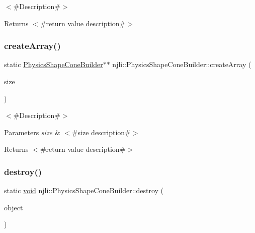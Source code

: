 $<$\#\+Description\#$>$

\begin{DoxyReturn}{Returns}
$<$\#return value description\#$>$ 
\end{DoxyReturn}
\mbox{\label{classnjli_1_1_physics_shape_cone_builder_ad52483797ddcb3189e2d28b386a22614}} 
\subsubsection{\texorpdfstring{create\+Array()}{createArray()}}
{\footnotesize\ttfamily static \mbox{\hyperlink{classnjli_1_1_physics_shape_cone_builder}{Physics\+Shape\+Cone\+Builder}}$\ast$$\ast$ njli\+::\+Physics\+Shape\+Cone\+Builder\+::create\+Array (\begin{DoxyParamCaption}\item[{const \mbox{\hyperlink{_util_8h_a10e94b422ef0c20dcdec20d31a1f5049}{u32}}}]{size }\end{DoxyParamCaption})\hspace{0.3cm}{\ttfamily [static]}}

$<$\#\+Description\#$>$


\begin{DoxyParams}{Parameters}
{\em size} & $<$\#size description\#$>$\\
\hline
\end{DoxyParams}
\begin{DoxyReturn}{Returns}
$<$\#return value description\#$>$ 
\end{DoxyReturn}
\mbox{\label{classnjli_1_1_physics_shape_cone_builder_a4257de7ae7743d0bf8a537b1c2c1c28b}} 
\subsubsection{\texorpdfstring{destroy()}{destroy()}}
{\footnotesize\ttfamily static \mbox{\hyperlink{_thread_8h_af1e856da2e658414cb2456cb6f7ebc66}{void}} njli\+::\+Physics\+Shape\+Cone\+Builder\+::destroy (\begin{DoxyParamCaption}\item[{\mbox{\hyperlink{classnjli_1_1_physics_shape_cone_builder}{Physics\+Shape\+Cone\+Builder}} $\ast$}]{object }\end{DoxyParamCaption})\hspace{0.3cm}{\ttfamily [static]}}

